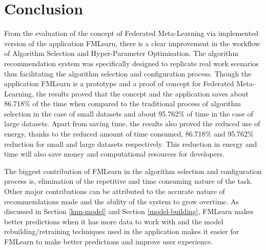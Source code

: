 \chapter{Conclusion}

From the evaluation of the concept of Federated Meta-Learning via implemented version of the application FMLearn, there is a clear improvement in the workflow of Algorithm Selection and Hyper-Parameter Optimisation. The algorithm recommendation system was specifically designed to replicate real work scenarios thus facilitating the algorithm selection and configuration process. Though the application FMLearn is a prototype and a proof of concept for Federated Meta-Learning, the results proved that the concept and the application saves about 86.718\% of the time when compared to the traditional process of algorithm selection in the case of small datasets and about 95.762\% of time in the case of large datasets. Apart from saving time, the results also proved the reduced use of energy, thanks to the reduced amount of time consumed, 86.718\% and 95.762\% reduction for small and large datasets respectively. This reduction in energy and time will also save money and computational resources for developers.

The biggest contribution of FMLearn in the algorithm selection and configuration process is, elimination of the repetitive and time consuming nature of the task. Other major contributions can be attributed to the accurate nature of recommendations made and the ability of the system to grow overtime. As discussed in Section \ref{knn-model} and Section \ref{model-building}, FMLearn makes better predictions when it has more data to work with and the model rebuilding/retraining techniques used in the application makes it easier for FMLearn to make better predictions and improve user experience. 